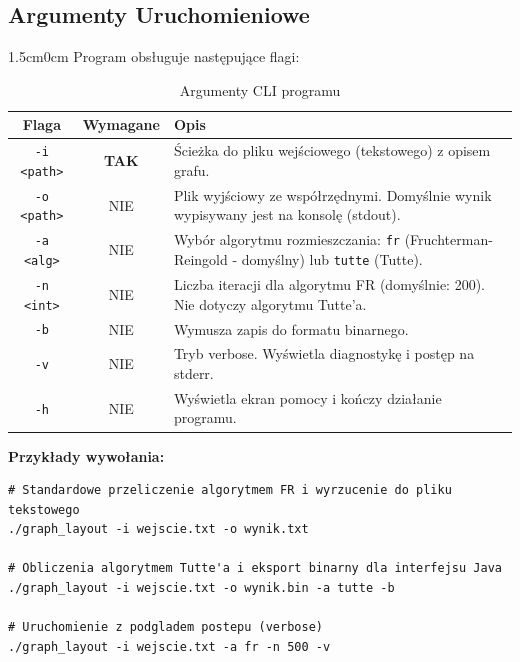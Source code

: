 \documentclass[12pt,a4paper]{article}
\begin{document}
\noindent
\begin{minipage}{\textwidth}
\subsection{Argumenty Uruchomieniowe}
\begin{adjustwidth}{1.5cm}{0cm}
Program obsługuje następujące flagi:
\begin{table}[H]
\centering
\begin{tabularx}{\linewidth}{|c|c|X|}
\hline
\textbf{Flaga} & \textbf{Wymagane} & \textbf{Opis} \\ \hline
\texttt{-i <path>} & \textbf{TAK} & Ścieżka do pliku wejściowego (tekstowego) z opisem grafu. \\ \hline
\texttt{-o <path>} & NIE & Plik wyjściowy ze współrzędnymi. Domyślnie wynik wypisywany jest na konsolę (stdout). \\ \hline
\texttt{-a <alg>}  & NIE & Wybór algorytmu rozmieszczania: \texttt{fr} (Fruchterman-Reingold - domyślny) lub \texttt{tutte} (Tutte). \\ \hline
\texttt{-n <int>}  & NIE & Liczba iteracji dla algorytmu FR (domyślnie: 200). Nie dotyczy algorytmu Tutte'a. \\ \hline
\texttt{-b}        & NIE & Wymusza zapis do formatu binarnego. \\ \hline
\texttt{-v}        & NIE & Tryb verbose. Wyświetla diagnostykę i postęp na stderr. \\ \hline
\texttt{-h}        & NIE & Wyświetla ekran pomocy i kończy działanie programu. \\ \hline
\end{tabularx}
\caption{Argumenty CLI programu}
\end{table}

\textbf{Przykłady wywołania:}
\begin{lstlisting}[style=terminal, caption={Przykłady użycia CLI}]
# Standardowe przeliczenie algorytmem FR i wyrzucenie do pliku tekstowego
./graph_layout -i wejscie.txt -o wynik.txt

# Obliczenia algorytmem Tutte'a i eksport binarny dla interfejsu Java
./graph_layout -i wejscie.txt -o wynik.bin -a tutte -b

# Uruchomienie z podgladem postepu (verbose)
./graph_layout -i wejscie.txt -a fr -n 500 -v
\end{lstlisting}
\end{adjustwidth}
\end{minipage}
\vspace{0.5cm}
\end{document}
